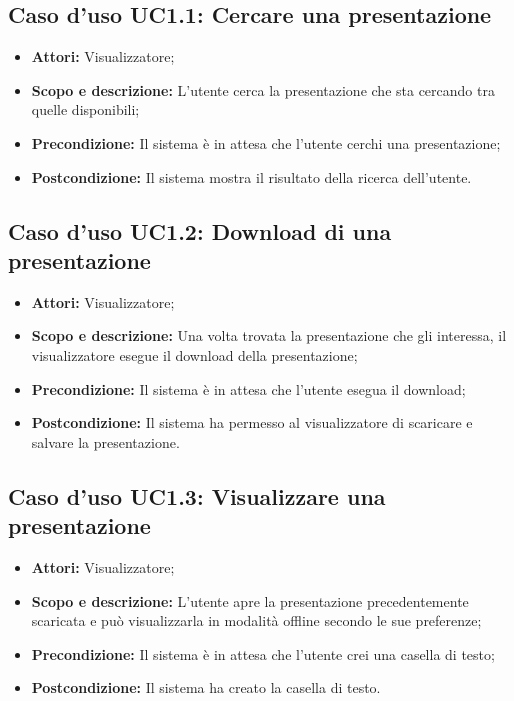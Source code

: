 \subsection{Caso d'uso UC1.1: Cercare una presentazione}
\begin{itemize}
	\item \textbf{Attori:} Visualizzatore;
	\item \textbf{Scopo e descrizione:} L'utente cerca la presentazione che sta cercando tra quelle disponibili;
	\item \textbf{Precondizione:} Il sistema è in attesa che l'utente cerchi una presentazione;
	\item \textbf{Postcondizione:} Il sistema mostra il risultato della ricerca dell'utente.
\end{itemize}

\subsection{Caso d'uso UC1.2: Download di una presentazione}
\begin{itemize}
\item \textbf{Attori:} Visualizzatore;
\item \textbf{Scopo e descrizione:} Una volta trovata la presentazione che gli interessa, il visualizzatore esegue il download della presentazione;
\item \textbf{Precondizione:} Il sistema è in attesa che l'utente esegua il download;
\item \textbf{Postcondizione:} Il sistema ha permesso al visualizzatore di scaricare e salvare la presentazione.
\end{itemize}

\subsection{Caso d'uso UC1.3: Visualizzare una presentazione}
\begin{itemize}
\item \textbf{Attori:} Visualizzatore;
\item \textbf{Scopo e descrizione:} L'utente apre la presentazione precedentemente scaricata e può visualizzarla in modalità offline secondo le sue preferenze;
\item \textbf{Precondizione:} Il sistema è in attesa che l'utente crei una casella di testo;
\item \textbf{Postcondizione:} Il sistema ha creato la casella di testo.
\end{itemize}

